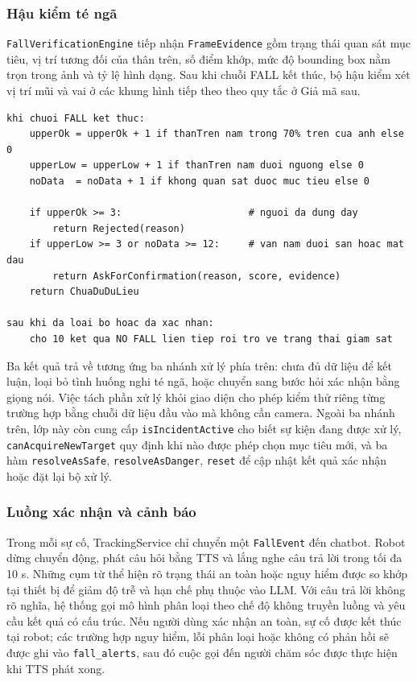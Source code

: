 \subsubsection{Hậu kiểm té ngã}

\texttt{FallVerificationEngine} tiếp nhận \texttt{FrameEvidence} gồm trạng thái quan sát mục tiêu, vị trí tương đối của thân trên, số điểm khớp, mức độ bounding box nằm trọn trong ảnh và tỷ lệ hình dạng. Sau khi chuỗi FALL kết thúc, bộ hậu kiểm xét vị trí mũi và vai ở các khung hình tiếp theo theo quy tắc ở Giả mã sau.

\begin{lstlisting}[caption={Giả mã bộ hậu kiểm té ngã}]
khi chuoi FALL ket thuc:
    upperOk = upperOk + 1 if thanTren nam trong 70% tren cua anh else 0
    upperLow = upperLow + 1 if thanTren nam duoi nguong else 0
    noData  = noData + 1 if khong quan sat duoc muc tieu else 0

    if upperOk >= 3:                      # nguoi da dung day
        return Rejected(reason)
    if upperLow >= 3 or noData >= 12:     # van nam duoi san hoac mat dau
        return AskForConfirmation(reason, score, evidence)
    return ChuaDuDuLieu

sau khi da loai bo hoac da xac nhan:
    cho 10 ket qua NO FALL lien tiep roi tro ve trang thai giam sat
\end{lstlisting}

Ba kết quả trả về tương ứng ba nhánh xử lý phía trên: chưa đủ dữ liệu để kết luận, loại bỏ tình huống nghi té ngã, hoặc chuyển sang bước hỏi xác nhận bằng giọng nói. Việc tách phần xử lý khỏi giao diện cho phép kiểm thử riêng từng trường hợp bằng chuỗi dữ liệu đầu vào mà không cần camera. Ngoài ba nhánh trên, lớp này còn cung cấp \texttt{isIncidentActive} cho biết sự kiện đang được xử lý, \texttt{canAcquireNewTarget} quy định khi nào được phép chọn mục tiêu mới, và ba hàm \texttt{resolveAsSafe}, \texttt{resolveAsDanger}, \texttt{reset} để cập nhật kết quả xác nhận hoặc đặt lại bộ xử lý.

\subsubsection{Luồng xác nhận và cảnh báo}

Trong mỗi sự cố, TrackingService chỉ chuyển một \texttt{FallEvent} đến chatbot. Robot dừng chuyển động, phát câu hỏi bằng TTS và lắng nghe câu trả lời trong tối đa 10 s. Những cụm từ thể hiện rõ trạng thái an toàn hoặc nguy hiểm được so khớp tại thiết bị để giảm độ trễ và hạn chế phụ thuộc vào LLM. Với câu trả lời không rõ nghĩa, hệ thống gọi mô hình phân loại theo chế độ không truyền luồng và yêu cầu kết quả có cấu trúc. Nếu người dùng xác nhận an toàn, sự cố được kết thúc tại robot; các trường hợp nguy hiểm, lỗi phân loại hoặc không có phản hồi sẽ được ghi vào \texttt{fall\_alerts}, sau đó cuộc gọi đến người chăm sóc được thực hiện khi TTS phát xong.

